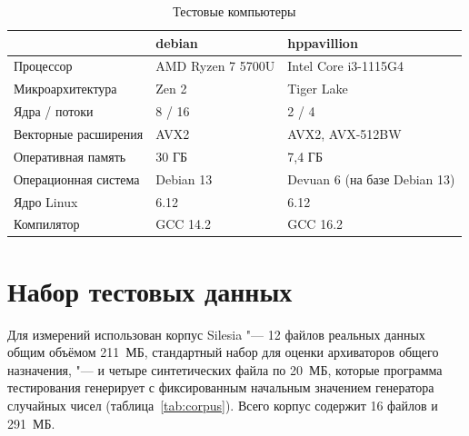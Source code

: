 \begin{table}[H]
\caption{Тестовые компьютеры}
\label{tab:machines}
\begin{tabletext}
\centering
\begin{tabular}{|l|l|l|}
\hline
 & \textbf{debian} & \textbf{hppavillion} \\
\hline
Процессор & AMD Ryzen 7 5700U & Intel Core i3-1115G4 \\
Микроархитектура & Zen 2 & Tiger Lake \\
Ядра / потоки & 8 / 16 & 2 / 4 \\
Векторные расширения & AVX2 & AVX2, AVX-512BW \\
Оперативная память & 30 ГБ & 7,4 ГБ \\
Операционная система & Debian 13 & Devuan 6 (на базе Debian 13) \\
Ядро Linux & 6.12 & 6.12 \\
Компилятор & GCC 14.2 & GCC 16.2 \\
\hline
\end{tabular}
\end{tabletext}
\end{table}


\section{Набор тестовых данных}

Для измерений использован корпус Silesia "--- 12 файлов
реальных данных общим объёмом 211~МБ, стандартный набор для оценки
архиваторов общего назначения, "--- и четыре синтетических файла по 20~МБ,
которые программа тестирования генерирует с фиксированным начальным
значением генератора случайных чисел (таблица~\ref{tab:corpus}). Всего
корпус содержит 16 файлов и 291~МБ.

